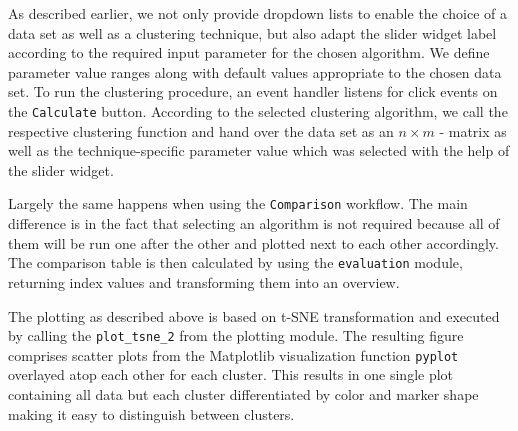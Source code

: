 As described earlier, we not only provide dropdown lists to enable the choice of a data set as well as a clustering technique, but also adapt the slider widget label according to the required input parameter for the chosen algorithm. We define parameter value ranges along with default values appropriate to the chosen data set. 
To run the clustering procedure, an event handler listens for click events on the \texttt{Calculate} button. According to the selected clustering algorithm, we call the respective clustering function and hand over the data set as an $n \times m$ - matrix as well as the technique-specific parameter value which was selected with the help of the slider widget.

Largely the same happens when using the \texttt{Comparison} workflow. The main difference is in the fact that selecting an algorithm is not required because all of them will be run one after the other and plotted next to each other accordingly. The comparison table is then calculated by using the \texttt{evaluation} module, returning index values and transforming them into an overview.

The plotting as described above is based on \gls{t-SNE} transformation and executed by calling the \texttt{plot_tsne_2} from the plotting module. The resulting figure comprises scatter plots from the Matplotlib visualization function \texttt{pyplot} \cite{Hunter:2007} overlayed atop each other for each cluster. This results in one single plot containing all data but each cluster differentiated by color and marker shape making it easy to distinguish between clusters.